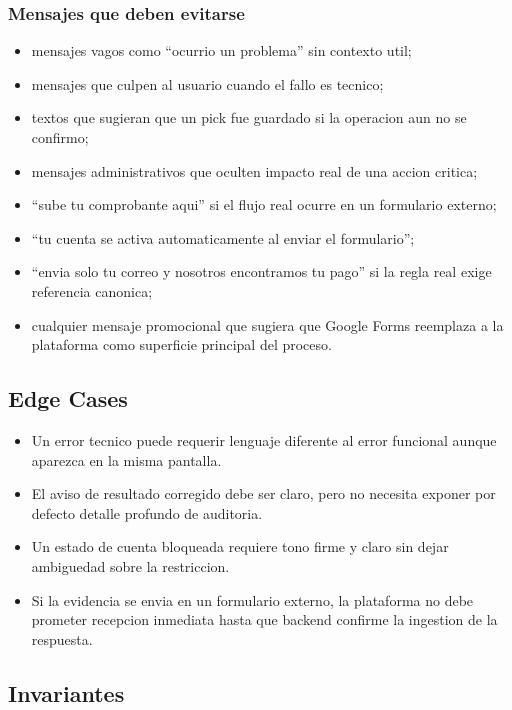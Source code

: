 \subsubsection{Mensajes que deben evitarse}

\begin{itemize}
  \item mensajes vagos como ``ocurrio un problema'' sin contexto util;
  \item mensajes que culpen al usuario cuando el fallo es tecnico;
  \item textos que sugieran que un pick fue guardado si la operacion aun no se confirmo;
  \item mensajes administrativos que oculten impacto real de una accion critica;
  \item ``sube tu comprobante aqui'' si el flujo real ocurre en un formulario externo;
  \item ``tu cuenta se activa automaticamente al enviar el formulario'';
  \item ``envia solo tu correo y nosotros encontramos tu pago'' si la regla real exige referencia canonica;
  \item cualquier mensaje promocional que sugiera que Google Forms reemplaza a la plataforma como superficie principal del proceso.
\end{itemize}

\subsection{Edge Cases}

\begin{itemize}
  \item Un error tecnico puede requerir lenguaje diferente al error funcional aunque aparezca en la misma pantalla.
  \item El aviso de resultado corregido debe ser claro, pero no necesita exponer por defecto detalle profundo de auditoria.
  \item Un estado de cuenta bloqueada requiere tono firme y claro sin dejar ambiguedad sobre la restriccion.
  \item Si la evidencia se envia en un formulario externo, la plataforma no debe prometer recepcion inmediata hasta que backend confirme la ingestion de la respuesta.
\end{itemize}

\subsection{Invariantes}

